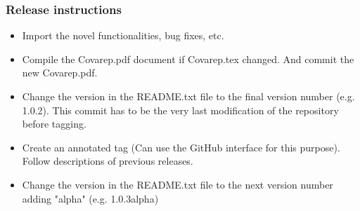 \documentclass{article}
\begin{document}
    \subsubsection{Release instructions}
    \begin{itemize}
    \item Import the novel functionalities, bug fixes, etc.
    \item Compile the Covarep.pdf document if Covarep.tex changed. And commit the new Covarep.pdf.
    \item Change the version in the README.txt file to the final version number (e.g. 1.0.2). This commit has to be the very last modification of the repository before tagging.
    \item Create an annotated tag (Can use the GitHub interface for this purpose). Follow descriptions of previous releases.
    \item Change the version in the README.txt file to the next version number adding "alpha" (e.g. 1.0.3alpha)
    \end{itemize}
    
% 
% 
\end{document}
